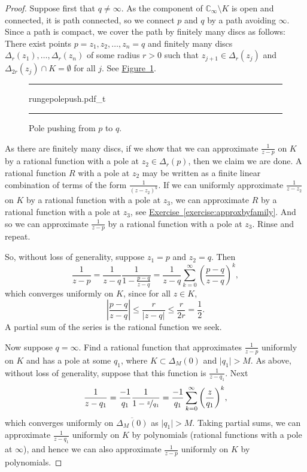 \documentclass[12pt,openany]{book}
\newcommand{\sabs}[1]{\lvert {#1} \rvert}
\newcommand{\abs}[1]{\left\lvert {#1} \right\rvert}
\newcommand{\C}{{\mathbb{C}}}
\theoremstyle{plain}
\theoremstyle{remark}
\theoremstyle{definition}
\newenvironment{myfig}{%
\begin{figure}[h!t]
\noindent\rule{\textwidth}{0.5pt}\vspace{12pt}\par\centering}%
{\par\noindent\rule{\textwidth}{0.5pt}
\end{figure}}
\theoremstyle{exercise}
\theoremstyle{example}
\newcommand{\figureref}[1]{\hyperref[#1]{Figure~\ref*{#1}}}
\newcommand{\exerciseref}[1]{\hyperref[#1]{Exercise~\ref*{#1}}}
\begin{document}
\begin{proof}
Suppose first that $q \neq \infty$.
As the component of $\C_\infty \setminus K$ is open and connected, it is
path connected,
so we connect $p$ and $q$ by a path avoiding $\infty$.
Since a path is compact,
we cover the path by finitely many discs as follows: 
There exist points $p=z_1,z_2,\ldots,z_n=q$ and
finitely many discs $\Delta_{r}(z_1),\ldots,\Delta_{r}(z_n)$
of some radius $r > 0$
such that $z_{j+1} \in \Delta_{r}(z_j)$
and $\Delta_{2r}(z_j) \cap K = \emptyset$ for all $j$.
See \figureref{fig:rungepolepush}.

\begin{myfig}
{rungepolepush.pdf_t}
\caption{Pole pushing from $p$ to $q$.\label{fig:rungepolepush}}
\end{myfig}

As there are finitely many discs, if we show that we can approximate
$\frac{1}{z-p}$ on $K$ by a rational function with a pole at $z_2 \in
\Delta_r(p)$, then we claim we are done.  A rational function $R$ with a pole
at $z_2$ may be written as
a finite linear combination of terms of the form $\frac{1}{{(z-z_2)}^k}$.
If we can uniformly approximate $\frac{1}{z-z_2}$ on $K$ by a rational
function with a pole at $z_3$, we can approximate $R$ by a rational function
with a pole at $z_3$, see \exerciseref{exercise:approxbyfamily}.
And so we can approximate $\frac{1}{z-p}$ by a rational function with a pole at $z_3$.
Rinse and repeat.

So, without loss of generality, suppose $z_1=p$ and $z_2=q$.
Then
\begin{equation*}
\frac{1}{z-p}
=
\frac{1}{z-q}
\frac{1}{1-\frac{p-q}{z-q}}
=
\frac{1}{z-q}
\sum_{k=0}^\infty
{\left(\frac{p-q}{z-q}\right)}^k ,
\end{equation*}
which converges uniformly on $K$, since for all $z \in K$,
\begin{equation*}
\abs{\frac{p-q}{z-q}}
\leq 
\frac{r}{\sabs{z-q}}
\leq
\frac{r}{2r} = \frac{1}{2} .
\end{equation*}
A partial sum of the series is the rational function we seek.

Now suppose $q =\infty$. Find a rational function
that approximates $\frac{1}{z-p}$ uniformly on $K$ and has a pole
at some $q_1$, where
$K \subset \Delta_M(0)$ and $\sabs{q_1} > M$.
As above, without loss of generality, suppose that this function
is $\frac{1}{z-q_1}$.
Next
\begin{equation*}
\frac{1}{z-q_1}
=
\frac{-1}{q_1}
\frac{1}{1-\nicefrac{z}{q_1}}
=
\frac{-1}{q_1}
\sum_{k=0}^\infty
{\left(\frac{z}{q_1}\right)}^k ,
\end{equation*}
which converges uniformly on $\overline{\Delta_M(0)}$ as  $\sabs{q_1} > M$.
Taking partial sums, we can approximate $\frac{1}{z-q_1}$
uniformly on $K$ by polynomials (rational functions with a pole at
$\infty$),
and hence we can also approximate $\frac{1}{z-p}$ uniformly on $K$ by polynomials.
\end{proof}
\end{document}
